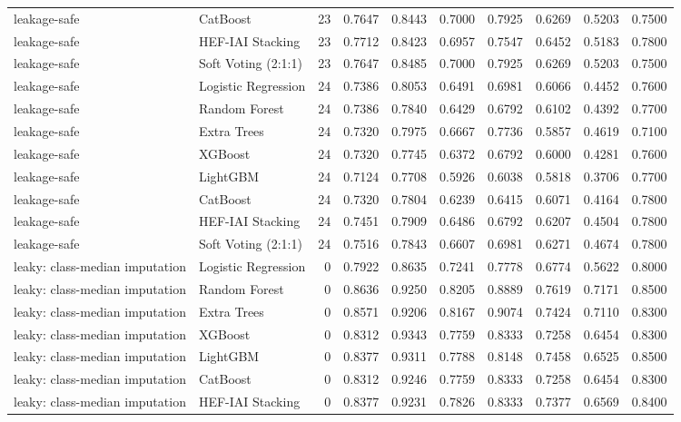 \begin{tabular}{llrrrrrrrr}
leakage-safe & CatBoost & 23 & 0.7647 & 0.8443 & 0.7000 & 0.7925 & 0.6269 & 0.5203 & 0.7500 \\
leakage-safe & HEF-IAI Stacking & 23 & 0.7712 & 0.8423 & 0.6957 & 0.7547 & 0.6452 & 0.5183 & 0.7800 \\
leakage-safe & Soft Voting (2:1:1) & 23 & 0.7647 & 0.8485 & 0.7000 & 0.7925 & 0.6269 & 0.5203 & 0.7500 \\
leakage-safe & Logistic Regression & 24 & 0.7386 & 0.8053 & 0.6491 & 0.6981 & 0.6066 & 0.4452 & 0.7600 \\
leakage-safe & Random Forest & 24 & 0.7386 & 0.7840 & 0.6429 & 0.6792 & 0.6102 & 0.4392 & 0.7700 \\
leakage-safe & Extra Trees & 24 & 0.7320 & 0.7975 & 0.6667 & 0.7736 & 0.5857 & 0.4619 & 0.7100 \\
leakage-safe & XGBoost & 24 & 0.7320 & 0.7745 & 0.6372 & 0.6792 & 0.6000 & 0.4281 & 0.7600 \\
leakage-safe & LightGBM & 24 & 0.7124 & 0.7708 & 0.5926 & 0.6038 & 0.5818 & 0.3706 & 0.7700 \\
leakage-safe & CatBoost & 24 & 0.7320 & 0.7804 & 0.6239 & 0.6415 & 0.6071 & 0.4164 & 0.7800 \\
leakage-safe & HEF-IAI Stacking & 24 & 0.7451 & 0.7909 & 0.6486 & 0.6792 & 0.6207 & 0.4504 & 0.7800 \\
leakage-safe & Soft Voting (2:1:1) & 24 & 0.7516 & 0.7843 & 0.6607 & 0.6981 & 0.6271 & 0.4674 & 0.7800 \\
leaky: class-median imputation & Logistic Regression & 0 & 0.7922 & 0.8635 & 0.7241 & 0.7778 & 0.6774 & 0.5622 & 0.8000 \\
leaky: class-median imputation & Random Forest & 0 & 0.8636 & 0.9250 & 0.8205 & 0.8889 & 0.7619 & 0.7171 & 0.8500 \\
leaky: class-median imputation & Extra Trees & 0 & 0.8571 & 0.9206 & 0.8167 & 0.9074 & 0.7424 & 0.7110 & 0.8300 \\
leaky: class-median imputation & XGBoost & 0 & 0.8312 & 0.9343 & 0.7759 & 0.8333 & 0.7258 & 0.6454 & 0.8300 \\
leaky: class-median imputation & LightGBM & 0 & 0.8377 & 0.9311 & 0.7788 & 0.8148 & 0.7458 & 0.6525 & 0.8500 \\
leaky: class-median imputation & CatBoost & 0 & 0.8312 & 0.9246 & 0.7759 & 0.8333 & 0.7258 & 0.6454 & 0.8300 \\
leaky: class-median imputation & HEF-IAI Stacking & 0 & 0.8377 & 0.9231 & 0.7826 & 0.8333 & 0.7377 & 0.6569 & 0.8400 \\

\end{tabular}
